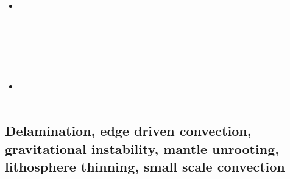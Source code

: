 \begin{scriptsize}
\begin{itemize}
\textcite{stbe18} \\
\item[\twothousandnineteen] 
\textcite{koen19} \\
\textcite{kipd19} \\
\textcite{crcm19} \\
\textcite{pedm19} \\
\textcite{mazz19} \\
\textcite{chch19} \\
\item[\twothousandtwenty] 
\textcite{yamq20} \\ 
\textcite{miko20} \\ 
\end{itemize}
\end{scriptsize}


\subsection{Delamination, edge driven convection, gravitational instability, mantle unrooting, lithosphere thinning, small scale convection} 

